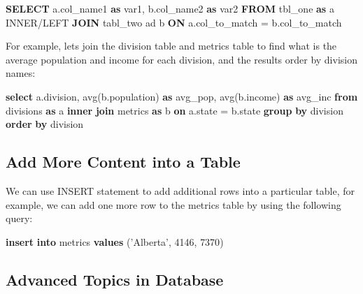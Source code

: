 \documentclass[]{book}
\newenvironment{Shaded}{\begin{snugshade}}{\end{snugshade}}
\newcommand{\KeywordTok}[1]{\textcolor[rgb]{0.13,0.29,0.53}{\textbf{{#1}}}}
\newcommand{\DecValTok}[1]{\textcolor[rgb]{0.00,0.00,0.81}{{#1}}}
\newcommand{\StringTok}[1]{\textcolor[rgb]{0.31,0.60,0.02}{{#1}}}
\newcommand{\FunctionTok}[1]{\textcolor[rgb]{0.00,0.00,0.00}{{#1}}}
\newcommand{\NormalTok}[1]{{#1}}
\theoremstyle{definition}
\theoremstyle{definition}
\theoremstyle{remark}
\begin{document}
\begin{Shaded}
\begin{Highlighting}[]
\KeywordTok{SELECT} \NormalTok{a.col_name1 }\KeywordTok{as} \NormalTok{var1, b.col_name2 }\KeywordTok{as} \NormalTok{var2}
\KeywordTok{FROM} \NormalTok{tbl_one }\KeywordTok{as} \NormalTok{a}
\NormalTok{INNER/LEFT }\KeywordTok{JOIN} \NormalTok{tabl_two ad b}
\KeywordTok{ON} \NormalTok{a.col_to_match = b.col_to_match}
\end{Highlighting}
\end{Shaded}

For example, lets join the division table and metrics table to find what
is the average population and income for each division, and the results
order by division names:

\begin{Shaded}
\begin{Highlighting}[]
\KeywordTok{select} \NormalTok{a.division, }\FunctionTok{avg}\NormalTok{(b.population) }\KeywordTok{as} \NormalTok{avg_pop,}
     \FunctionTok{avg}\NormalTok{(b.income) }\KeywordTok{as} \NormalTok{avg_inc}
\KeywordTok{from} \NormalTok{divisions }\KeywordTok{as} \NormalTok{a}
\KeywordTok{inner} \KeywordTok{join} \NormalTok{metrics }\KeywordTok{as} \NormalTok{b}
\KeywordTok{on} \NormalTok{a.state = b.state}
\KeywordTok{group} \KeywordTok{by} \NormalTok{division}
\KeywordTok{order} \KeywordTok{by} \NormalTok{division}
\end{Highlighting}
\end{Shaded}

\subsection{Add More Content into a
Table}\label{add-more-content-into-a-table}

We can use INSERT statement to add additional rows into a particular
table, for example, we can add one more row to the metrics table by
using the following query:

\begin{Shaded}
\begin{Highlighting}[]
\KeywordTok{insert} \KeywordTok{into} \NormalTok{metrics}
\KeywordTok{values} \NormalTok{(}\StringTok{'Alberta'}\NormalTok{, }\DecValTok{4146}\NormalTok{, }\DecValTok{7370}\NormalTok{)}
\end{Highlighting}
\end{Shaded}

\subsection{Advanced Topics in
Database}\label{advanced-topics-in-database}
\end{document}
